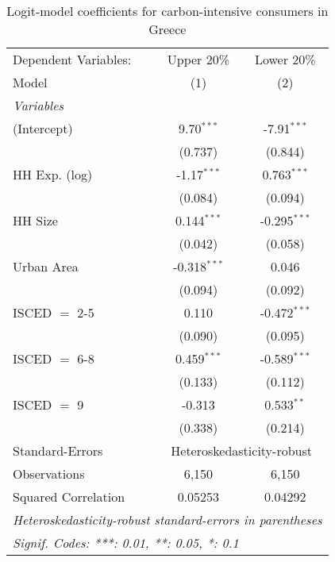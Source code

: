 
\begin{table}[htbp!]
   \centering
   \small
   \begin{adjustbox}{width = 1\textwidth, max height = 0.95\textheight, center}
      \begin{threeparttable}[b]
         \caption{\label{tab:Logit_1_GRC} Logit-model coefficients for carbon-intensive consumers in Greece}
         \begin{tabular}{lcc}
            \tabularnewline \midrule \midrule
            Dependent Variables: & Upper 20\%     & Lower 20\%\\   
            Model                & (1)            & (2)\\  
            \midrule
            \emph{Variables}\\
            (Intercept)          & 9.70$^{***}$   & -7.91$^{***}$\\   
                                 & (0.737)        & (0.844)\\   
            HH Exp. (log)        & -1.17$^{***}$  & 0.763$^{***}$\\   
                                 & (0.084)        & (0.094)\\   
            HH Size              & 0.144$^{***}$  & -0.295$^{***}$\\   
                                 & (0.042)        & (0.058)\\   
            Urban Area           & -0.318$^{***}$ & 0.046\\   
                                 & (0.094)        & (0.092)\\   
            ISCED $=$ 2-5        & 0.110          & -0.472$^{***}$\\   
                                 & (0.090)        & (0.095)\\   
            ISCED $=$ 6-8        & 0.459$^{***}$  & -0.589$^{***}$\\   
                                 & (0.133)        & (0.112)\\   
            ISCED $=$ 9          & -0.313         & 0.533$^{**}$\\   
                                 & (0.338)        & (0.214)\\   
            \midrule 
            Standard-Errors & \multicolumn{2}{c}{Heteroskedasticity-robust} \\ 
            Observations         & 6,150          & 6,150\\  
            Squared Correlation  & 0.05253        & 0.04292\\  
            \midrule \midrule
            \multicolumn{3}{l}{\emph{Heteroskedasticity-robust standard-errors in parentheses}}\\
            \multicolumn{3}{l}{\emph{Signif. Codes: ***: 0.01, **: 0.05, *: 0.1}}\\
         \end{tabular}
         

\end{threeparttable}
\end{adjustbox}
\end{table}
